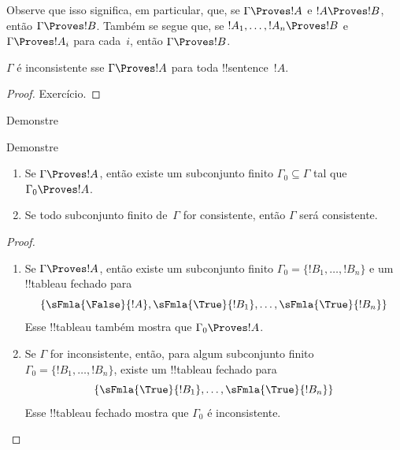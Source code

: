 \documentclass[../../../include/open-logic-section]{subfiles}
\begin{document}
Observe que isso significa, em particular, que, se $\Gamma \Proves !A$
e $!A \Proves !B$, então $\Gamma \Proves !B$. Também se segue que, se
$!A_1, \dots, !A_n \Proves !B$ e $\Gamma \Proves !A_i$ para cada~$i$,
então $\Gamma \Proves !B$.

\begin{prop}
$\Gamma$ é inconsistente sse $\Gamma \Proves !A$ para toda
!!{sentence}~$!A$.
\end{prop}

\begin{proof}
Exercício.
\end{proof}

\begin{prob}
Demonstre 
\end{prob}
\tagendprob

\begin{prob}
Demonstre 
\end{prob}
\tagendprob

\begin{prop}[Compacidade]
  \begin{enumerate}
  \item Se $\Gamma \Proves !A$, então existe um subconjunto finito
    $\Gamma_0 \subseteq \Gamma$ tal que $\Gamma_0 \Proves !A$.
  \item Se todo subconjunto finito de~$\Gamma$ for consistente, então
    $\Gamma$ será consistente.
  \end{enumerate}
\end{prop}

\begin{proof}
  \begin{enumerate}
    \item Se $\Gamma \Proves !A$, então existe um subconjunto finito
      $\Gamma_0 = \{!B_1, \dots, !B_n\}$ e um !!{tableau} fechado para
      \[
      \{\sFmla{\False}{!A}, \sFmla{\True}{!B_1}, \dots, \sFmla{\True}{!B_n}\}
      \]
      Esse !!{tableau} também mostra que $\Gamma_0 \Proves !A$.
    \item Se $\Gamma$ for inconsistente, então, para algum subconjunto
      finito $\Gamma_0 = \{!B_1, \dots, !B_n\}$, existe um !!{tableau}
      fechado para
      \[
      \{\sFmla{\True}{!B_1}, \dots, \sFmla{\True}{!B_n}\}
      \]
      Esse !!{tableau} fechado mostra que $\Gamma_0$ é inconsistente.
  \end{enumerate}
\end{proof}
\end{document}
